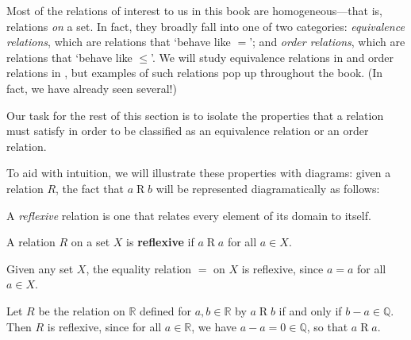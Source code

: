 Most of the relations of interest to us in this book are homogeneous---that is, relations \textit{on} a set. In fact, they broadly fall into one of two categories: \textit{equivalence relations}, which are relations that `behave like $=$'; and \textit{order relations}, which are relations that `behave like $\le$'. We will study equivalence relations in  and order relations in , but examples of such relations pop up throughout the book. (In fact, we have already seen several!)

Our task for the rest of this section is to isolate the properties that a relation must satisfy in order to be classified as an equivalence relation or an order relation.

To aid with intuition, we will illustrate these properties with diagrams: given a relation $R$, the fact that $a \mathrel{R} b$ will be represented diagramatically as follows:
\begin{center}
\end{center}

A \textit{reflexive} relation is one that relates every element of its domain to itself.

\begin{definition}
\label{defReflexiveRelation}
A relation $R$ on a set $X$ is \textbf{reflexive} if $a \mathrel{R} a$ for all $a \in X$.
\end{definition}

\begin{center}
\end{center}

\begin{example}
\label{exEqualityIsReflexive}
Given any set $X$, the equality relation $=$ on $X$ is reflexive, since $a = a$ for all $a \in X$.
\end{example}

\begin{example}
\label{exDifferenceOfRealsInQIsReflexive}
Let $R$ be the relation on $\mathbb{R}$ defined for $a,b \in \mathbb{R}$ by $a \mathrel{R} b$ if and only if $b-a \in \mathbb{Q}$. Then $R$ is reflexive, since for all $a \in \mathbb{R}$, we have $a-a = 0 \in \mathbb{Q}$, so that $a \mathrel{R} a$.
\end{example}

